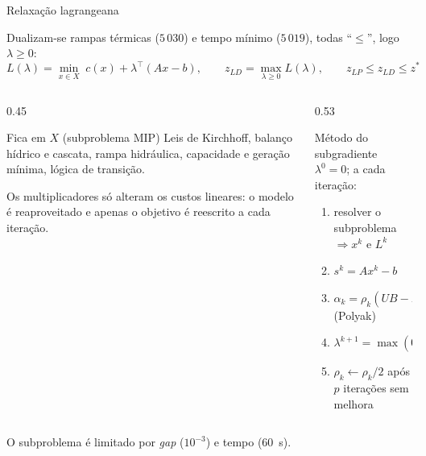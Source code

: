 \documentclass[10pt,aspectratio=169]{beamer}
\newcommand{\displaycompacto}{%
  \setlength{\abovedisplayskip}{2pt}%
  \setlength{\belowdisplayskip}{2pt}%
  \setlength{\abovedisplayshortskip}{2pt}%
  \setlength{\belowdisplayshortskip}{2pt}%
}
\begin{document}
\begin{frame}{Relaxação lagrangeana}
  \small
  \displaycompacto
  Dualizam-se \alert{rampas térmicas} ($5\,030$) e \alert{tempo mínimo} ($5\,019$),
  todas ``$\le$'', logo $\lambda \ge 0$:
  \[
    L(\lambda) = \min_{x \in X} \; c(x) + \lambda^\top (A x - b),
    \qquad
    z_{LD} = \max_{\lambda \ge 0} L(\lambda),
    \qquad
    z_{LP} \le z_{LD} \le z^*
  \]

  \vspace{0.2em}
  \begin{columns}[T]
    \begin{column}{0.45\textwidth}
      \begin{block}{Fica em $X$ (subproblema MIP)}
        \footnotesize
        Leis de Kirchhoff, balanço hídrico e cascata, \alert{rampa hidráulica},
        capacidade e geração mínima, lógica de transição.

        \vspace{0.3em}
        Os multiplicadores só alteram os custos lineares: o modelo é reaproveitado
        e apenas o objetivo é reescrito a cada iteração.
      \end{block}
    \end{column}
    \begin{column}{0.53\textwidth}
      \begin{block}{Método do subgradiente}
        \footnotesize
        $\lambda^0 = 0$; a cada iteração:
        \begin{enumerate}\itemsep1pt
          \item resolver o subproblema $\Rightarrow x^k$ e $L^k$
          \item $s^k = A x^k - b$
          \item $\alpha_k = \rho_k (UB - L^k) / \|s^k\|^2$ \hfill (Polyak)
          \item $\lambda^{k+1} = \max(0,\; \lambda^k + \alpha_k s^k)$
          \item $\rho_k \leftarrow \rho_k / 2$ após $p$ iterações sem melhora
        \end{enumerate}
      \end{block}
    \end{column}
  \end{columns}

  \vspace{0.2em}
  \footnotesize
  O subproblema é limitado por \emph{gap} ($10^{-3}$) e tempo ($60$~s).
\end{frame}
\end{document}
